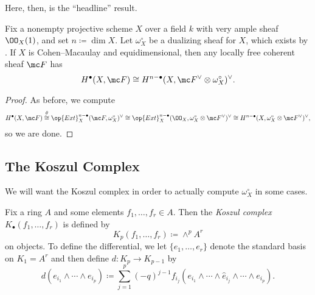 \documentclass[../notes.tex]{subfiles}
\begin{document}
Here, then, is the ``headline'' result.
\begin{corollary}
	Fix a nonempty projective scheme $X$ over a field $k$ with very ample sheaf $\OO_X(1)$, and set $n\coloneqq\dim X$. Let $\omega_X^\circ$ be a dualizing sheaf for $X$, which exists by . If $X$ is Cohen--Macaulay and equidimensional, then any locally free coherent sheaf $\mc F$ has
	\[H^\bullet(X,\mc F)\cong H^{n-\bullet}(X,\mc F^\lor\otimes\omega_X^\circ)^\lor.\]
\end{corollary}
\begin{proof}
	As before, we compute
	\[H^\bullet(X,\mc F)\stackrel\theta\cong\op{Ext}^{n-\bullet}_X(\mc F,\omega_X^\circ)^\lor\cong\op{Ext}^{n-\bullet}_X(\OO_X,\omega_X^\circ\otimes\mc F^\lor)^\lor\cong H^{n-\bullet}(X,\omega_X^\circ\otimes\mc F^\lor)^\lor,\]
	so we are done.
\end{proof}

\subsection{The Koszul Complex}
We will want the Koszul complex in order to actually compute $\omega_X^\circ$ in some cases.
\begin{definition}
	Fix a ring $A$ and some elements $f_1,\ldots,f_r\in A$. Then the \textit{Koszul complex} $K_\bullet(f_1,\ldots,f_r)$ is defined by
	\[K_p(f_1,\ldots,f_r)\coloneqq\land^pA^r\]
	on objects. To define the differential, we let $\{e_1,\ldots,e_r\}$ denote the standard basis on $K_1=A^r$ and then define $d\colon K_p\to K_{p-1}$ by
	\[d(e_{i_1}\land\cdots\land e_{i_p})\coloneqq\sum_{j=1}^p(-q)^{j-1}f_{i_j}(e_{i_1}\land\cdots\land\widehat e_{i_j}\land\cdots\land e_{i_p}).\]
\end{definition}
\end{document}
